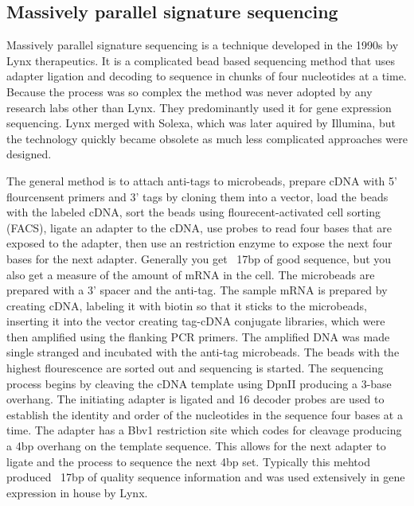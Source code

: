 \documentclass{report}\usepackage[]{graphicx}\usepackage[]{color}
\begin{document}
\subsection*{Massively parallel signature sequencing}
Massively parallel signature sequencing is a technique developed in the 1990s by Lynx therapeutics. It is a 
complicated bead based sequencing method that uses adapter ligation and decoding to sequence in chunks
of four nucleotides at a time. Because the process was so complex the method was never adopted by any
research labs other than Lynx. They predominantly used it for gene expression sequencing. Lynx merged with
Solexa, which was later aquired by Illumina, but the technology quickly became obsolete as much less complicated
approaches were designed. 

The general method is to attach anti-tags to microbeads, prepare cDNA with 5' flourcensent primers and 3' tags
by cloning them into a vector, load the beads with the labeled cDNA, sort the beads using flourecent-activated 
cell sorting (FACS), ligate an adapter to the cDNA, use probes to read four bases that are exposed to the adapter, 
then use an restriction enzyme to expose the next four bases for the next adapter. Generally you get ~17bp of
good sequence, but you also get a measure of the amount of mRNA in the cell. The microbeads are prepared
with a 3' spacer and the anti-tag. The sample mRNA is prepared by creating cDNA, labeling it with biotin so
that it sticks to the microbeads, inserting it into the vector creating tag-cDNA conjugate libraries, which were
then amplified using the flanking PCR primers. The amplified DNA was made single stranged and incubated 
with the anti-tag microbeads. The beads with the highest flourescence are sorted out and sequencing is started.
The sequencing process begins by cleaving the cDNA template using DpnII producing a 3-base overhang. 
The initiating adapter is ligated and 16 decoder probes are used to establish the identity and order of the 
nucleotides in the sequence four bases at a time. The adapter has a Bbv1 restriction site which 
codes for cleavage producing a 4bp overhang on the template sequence. This allows for the next adapter to ligate
and the process to sequence the next 4bp set. Typically this mehtod produced ~17bp of quality sequence information
and was used extensively in gene expression in house by Lynx. 
\end{document}
